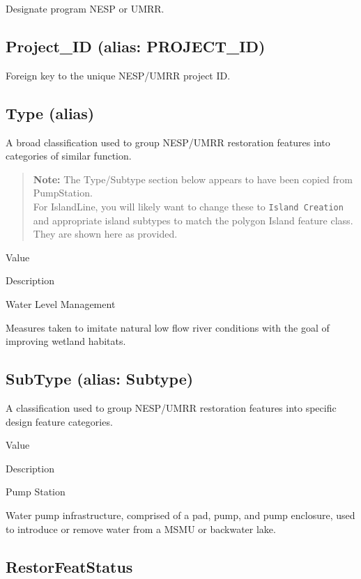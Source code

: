 \documentclass[
  letterpaper,
  DIV=11,
  numbers=noendperiod]{scrreprt}
\begin{document}
Designate program NESP or UMRR.

\subsection{Project\_ID (alias:
PROJECT\_ID)}\label{project_id-alias-project_id-6}

Foreign key to the unique NESP/UMRR project ID.

\subsection{Type (alias)}\label{type-alias-5}

A broad classification used to group NESP/UMRR restoration features into
categories of similar function.

\begin{quote}
\textbf{Note:} The Type/Subtype section below appears to have been
copied from PumpStation.\\
For IslandLine, you will likely want to change these to
\texttt{Island\ Creation} and appropriate island subtypes to match the
polygon Island feature class. They are shown here as provided.
\end{quote}

Value

Description

Water Level Management

Measures taken to imitate natural low flow river conditions with the
goal of improving wetland habitats.

\subsection{SubType (alias: Subtype)}\label{subtype-alias-subtype-6}

A classification used to group NESP/UMRR restoration features into
specific design feature categories.

Value

Description

Pump Station

Water pump infrastructure, comprised of a pad, pump, and pump enclosure,
used to introduce or remove water from a MSMU or backwater lake.

\subsection{RestorFeatStatus}\label{restorfeatstatus-6}
\end{document}
